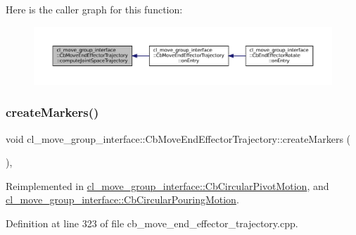 Here is the caller graph for this function\+:
\nopagebreak
\begin{figure}[H]
\begin{center}
\leavevmode
\includegraphics[width=350pt]{classcl__move__group__interface_1_1CbMoveEndEffectorTrajectory_a485057c052729edd3e8303440b7ada66_icgraph}
\end{center}
\end{figure}
\mbox{\label{classcl__move__group__interface_1_1CbMoveEndEffectorTrajectory_a442efa1d5bc9e9a16f74ecd31b13d9b5}} 
\subsubsection{\texorpdfstring{create\+Markers()}{createMarkers()}}
{\footnotesize\ttfamily void cl\+\_\+move\+\_\+group\+\_\+interface\+::\+Cb\+Move\+End\+Effector\+Trajectory\+::create\+Markers (\begin{DoxyParamCaption}{ }\end{DoxyParamCaption})\hspace{0.3cm}{\ttfamily [protected]}, {\ttfamily [virtual]}}



Reimplemented in \hyperlink{classcl__move__group__interface_1_1CbCircularPivotMotion_a48911ad62608cb00c04e979e2f6f644a}{cl\+\_\+move\+\_\+group\+\_\+interface\+::\+Cb\+Circular\+Pivot\+Motion}, and \hyperlink{classcl__move__group__interface_1_1CbCircularPouringMotion_a26d603b1d9bdbf5b71da6c1c4af2c322}{cl\+\_\+move\+\_\+group\+\_\+interface\+::\+Cb\+Circular\+Pouring\+Motion}.



Definition at line 323 of file cb\+\_\+move\+\_\+end\+\_\+effector\+\_\+trajectory.\+cpp.



